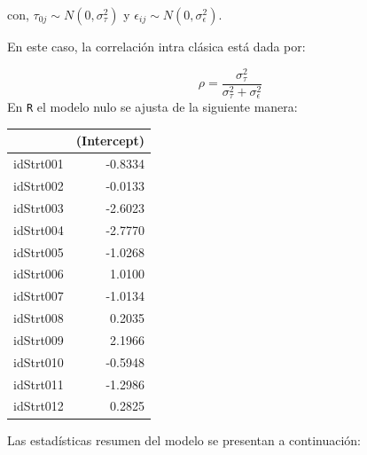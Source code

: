 \documentclass[
  12pt,
]{book}
\newenvironment{Shaded}{\begin{snugshade}}{\end{snugshade}}
\newcommand{\AttributeTok}[1]{\textcolor[rgb]{0.13,0.29,0.53}{#1}}
\newcommand{\DecValTok}[1]{\textcolor[rgb]{0.00,0.00,0.81}{#1}}
\newcommand{\FunctionTok}[1]{\textcolor[rgb]{0.13,0.29,0.53}{\textbf{#1}}}
\newcommand{\NormalTok}[1]{#1}
\newcommand{\OtherTok}[1]{\textcolor[rgb]{0.56,0.35,0.01}{#1}}
\newcommand{\SpecialCharTok}[1]{\textcolor[rgb]{0.81,0.36,0.00}{\textbf{#1}}}
\newcommand{\StringTok}[1]{\textcolor[rgb]{0.31,0.60,0.02}{#1}}
\begin{document}
con,
\(\tau_{0j}\sim N\left(0,\sigma_{\tau}^{2}\right)\) y \(\epsilon_{ij}\sim N\left(0,\sigma_{\epsilon}^{2}\right)\).

En este caso, la correlación intra clásica está dada por:

\[
\rho=\frac{\sigma_{\tau}^{2}}{\sigma_{\tau}^{2}+\sigma_{\epsilon}^{2}}
\]
En \texttt{R} el modelo nulo se ajusta de la siguiente manera:

\begin{Shaded}
\end{Shaded}

\begin{tabular}{l|r}
\hline
  & (Intercept)\\
\hline
idStrt001 & -0.8334\\
\hline
idStrt002 & -0.0133\\
\hline
idStrt003 & -2.6023\\
\hline
idStrt004 & -2.7770\\
\hline
idStrt005 & -1.0268\\
\hline
idStrt006 & 1.0100\\
\hline
idStrt007 & -1.0134\\
\hline
idStrt008 & 0.2035\\
\hline
idStrt009 & 2.1966\\
\hline
idStrt010 & -0.5948\\
\hline
idStrt011 & -1.2986\\
\hline
idStrt012 & 0.2825\\
\hline
\end{tabular}

Las estadísticas resumen del modelo se presentan a continuación:
\end{document}
